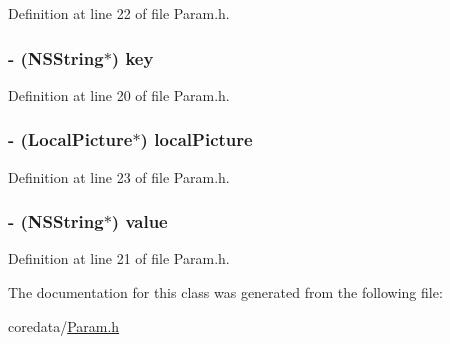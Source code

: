 Definition at line 22 of file Param.h.

\hypertarget{interface_param_a0b6a9866e1390620790387442c1fb8be}{
\subsubsection[{key}]{\setlength{\rightskip}{0pt plus 5cm}-\/ (NSString$\ast$) key}}
\label{interface_param_a0b6a9866e1390620790387442c1fb8be}


Definition at line 20 of file Param.h.

\hypertarget{interface_param_a188b0e359426f49c922be3306c54e028}{
\subsubsection[{localPicture}]{\setlength{\rightskip}{0pt plus 5cm}-\/ ({\bf LocalPicture}$\ast$) localPicture}}
\label{interface_param_a188b0e359426f49c922be3306c54e028}


Definition at line 23 of file Param.h.

\hypertarget{interface_param_a450e6764e415b0f430eac319e099ba48}{
\subsubsection[{value}]{\setlength{\rightskip}{0pt plus 5cm}-\/ (NSString$\ast$) value}}
\label{interface_param_a450e6764e415b0f430eac319e099ba48}


Definition at line 21 of file Param.h.



The documentation for this class was generated from the following file:\begin{DoxyCompactItemize}
\item 
coredata/\hyperlink{_param_8h}{Param.h}\end{DoxyCompactItemize}
